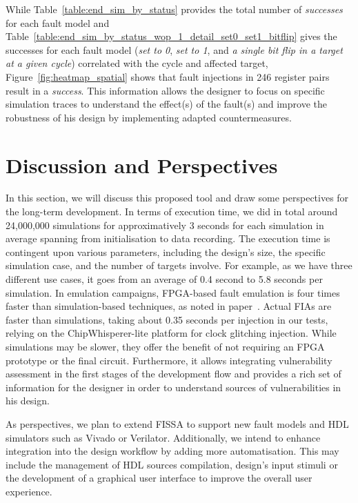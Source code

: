 While Table~\ref{table:end_sim_by_status} provides the total number of \textit{successes} for each fault model and Table~\ref{table:end_sim_by_status_wop_1_detail_set0_set1_bitflip} gives the successes for each fault model (\textit{set to 0}, \textit{set to 1}, and \textit{a single bit flip in a target at a given cycle}) correlated with the cycle and affected target, Figure~\ref{fig:heatmap_spatial} shows that fault injections in 246 register pairs result in a \textit{success}. This information allows the designer to focus on specific simulation traces to understand the effect(s) of the fault(s) and improve the robustness of his design by implementing adapted countermeasures.

\section{Discussion and Perspectives}

In this section, we will discuss this proposed tool and draw some perspectives for the long-term development.
In terms of execution time, we did in total around 24,000,000 simulations for approximatively 3 seconds for each simulation in average spanning from initialisation to data recording.
The execution time is contingent upon various parameters, including the design's size, the specific simulation case, and the number of targets involve. For example, as we have three different use cases, it goes from an average of 0.4 second to 5.8 seconds per simulation.
In emulation campaigns, FPGA-based fault emulation is four times faster than simulation-based techniques, as noted in paper~\cite{NNHRS-14-dsd}. Actual FIAs are faster than simulations, taking about 0.35 seconds per injection in our tests, relying on the ChipWhisperer-lite platform for clock glitching injection.
While simulations may be slower, they offer the benefit of not requiring an FPGA prototype or the final circuit. Furthermore, it allows integrating vulnerability assessment in the first stages of the development flow and provides a rich set of information for the designer in order to understand sources of vulnerabilities in his design.

As perspectives, we plan to extend FISSA to support new fault models and HDL simulators such as Vivado or Verilator.
Additionally, we intend to enhance integration into the design workflow by adding more automatisation. This may include the management of HDL sources compilation, design's input stimuli or the development of a graphical user interface to improve the overall user experience.
